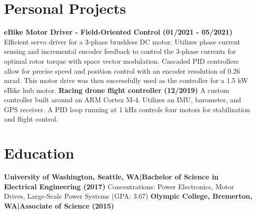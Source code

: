 \documentclass[]{article}
\begin{document}
\begin{singlespace}
\section*{Personal Projects}


\textbf{eBike Motor Driver - Field-Oriented Control (01/2021 - 05/2021)}\newline
Efficient servo driver for a 3-phase brushless DC motor.
Utilizes phase current sensing and incremental encoder feedback to control the 3-phase currents for optimal rotor torque with space vector modulation.
Cascaded PID controllers allow for precise speed and position control with an encoder resolution of 0.26 mrad.\newline
This motor drive was then successfully used as the controller for a 1.5 kW eBike hub motor.
\vspace{-2mm}\newline\newline
\textbf{Racing drone flight controller (12/2019)}\newline
A custom controller built around an ARM Cortex M-4. Utilizes an IMU, barometer, and GPS receiver. A PID loop
running at 1 kHz controls four motors for stabilization and flight control.


\section*{Education}

\textbf{University of Washington, Seattle, WA\hspace{3 mm}|\hspace{3 mm}Bachelor of Science in Electrical Engineering (2017)}
\newline Concentrations: Power Electronics, Motor Drives, Large-Scale Power Systems (GPA: 3.67)
\vspace{-3mm}
\newline\break\textbf{Olympic College, Bremerton, WA\hspace{3 mm}|\hspace{3 mm}Associate of Science (2015)}

\end{singlespace}
\end{document}
